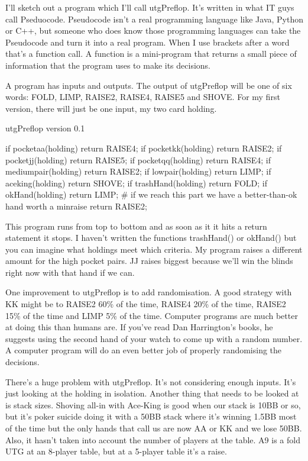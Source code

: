 I'll sketch out a program which I'll call utgPreflop. It's written
in what IT guys call Pseduocode. Pseudocode isn't a real programming
language like Java, Python or C++, but someone who does know those
programming languages can take the Pseudocode and turn it into a real
program. When I use brackets after a word that's a function call.
A function is a mini-program that returns a small piece of information
that the program uses to make its decisions.

A program has inputs and outputs. The output of utgPreflop will
be one of six words: FOLD, LIMP, RAISE2, RAISE4, RAISE5 and SHOVE.
For my first version, there will just be one input, my two card
holding.

utgPreflop version 0.1


if pocketaa(holding) return RAISE4;
if pocketkk(holding) return RAISE2;
if pocketjj(holding) return RAISE5;
if pocketqq(holding) return RAISE4;
if mediumpair(holding) return RAISE2;
if lowpair(holding) return LIMP;
if aceking(holding) return SHOVE;
if trashHand(holding) return FOLD;
if okHand(holding) return LIMP;
\# if we reach this part we have a better-than-ok hand worth a minraise
return RAISE2;

This program runs from top to bottom and as soon as it it hits a
return statement it stops. I haven't written the functions
trashHand() or okHand() but you can imagine what holdings
meet which criteria. My program raises a different amount
for the high pocket pairs. JJ raises biggest because we'll win the
blinds right now with that hand if we can.

One improvement to utgPreflop is to add randomisation. A good strategy
with KK might be to RAISE2 60\% of the time, RAISE4 20\% of the time,
RAISE2 15\% of the time and LIMP 5\% of the time. Computer programs
are much better at doing this than humans are. If you've read
Dan Harrington's books, he suggests using the second hand of your
watch to come up with a random number. A computer program will do an
even better job of properly randomising the decisions.

There's a huge problem with utgPreflop. It's not considering enough
inputs. It's just looking at the holding in isolation. Another thing
that needs to be looked at is stack sizes. Shoving all-in with
Ace-King is good when our stack is 10BB or so, but it's poker suicide
doing it with a 50BB stack where it's winning 1.5BB most of the
time but the only hands that call us are now AA or KK and we lose 50BB.
Also, it hasn't taken into account the number of players at
the table. A9 is a fold UTG at an 8-player table, but at a 5-player
table it's a raise.

